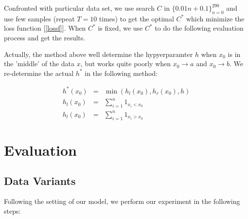 \documentclass[twoside]{article}
\begin{document}
Confronted with particular data set, we use search $C$ in $\{0.01n+0.1\}_{n=0}^{290}$ and use few samples (repeat $T=10$ times) to get the optimal $C^*$ which minimize the loss function [\ref{lossf}]. When $C^*$ is fixed, we use $C^*$ to do the following evaluation process and get the results.

Actually, the method above well determine the hypyerparamter $h$ when $x_0$ is in the 'middle' of the data $x$, but works quite poorly when $x_0 \to a$ and $x_0 \to b$. We re-determine the actual $h^*$ in the following method:

\begin{eqnarray}
\label{msef}
  h^*(x_0) &=& \min(h_l(x_0), h_r(x_0), h)\\
  h_l(x_0) &=& \sum_{i=1}^n{1_{x_i<x_0}}\\
  h_l(x_0) &=& \sum_{i=1}^n{1_{x_i>x_0}}
\end{eqnarray}

\section{Evaluation}

\subsection{Data Variants}

\label{process}

Following the setting of our model, we perform our experiment in the following steps:
\end{document}
